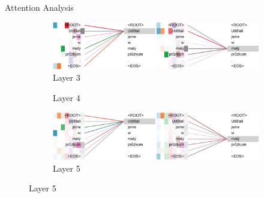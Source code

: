\documentclass{beamer}
\def\DepParse{\texttt{DepParse}\xspace}
\begin{document}
\begin{frame}{Attention Analysis}
\begin{figure}[t]
    \centering
    \small
    \begin{subfigure}[b]{0.6\textwidth}
        \centering
	    \includegraphics[width=\textwidth]{img/att-from4-l3.png}
        \caption{Layer 3}
    \end{subfigure}
    \par\medskip
    \begin{subfigure}[b]{0.6\textwidth}
        \centering
        \caption{Layer 4}
    \end{subfigure}
    \par\medskip
    \begin{subfigure}[b]{0.6\textwidth}
        \centering
	    \includegraphics[width=\textwidth]{img/att-from4-l5.png}
        \caption{Layer 5}
    \end{subfigure}
\end{figure}
\end{frame}

\end{document}
